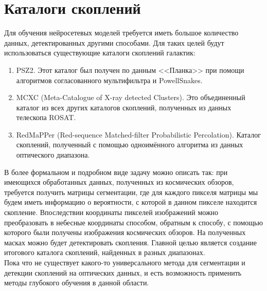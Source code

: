\section{Каталоги скоплений}
Для обучения нейросетевых моделей требуется иметь большое количество данных, детектированных другими
способами. Для таких целей будут использоваться существующие каталоги скоплений галактик:

\begin{enumerate}
	\item PSZ2. Этот каталог был получен по данным <<Планка>>  при помощи алгоритмов 
	согласованного мультифильтра и PowellSnakes.
	\item MCXC (Meta-Catalogue of X-ray detected Clusters). Это объединенный каталог из всех 
	других каталогов скоплений, полученных из данных телескопа ROSAT.
	\item RedMaPPer (Red-sequence Matched-filter Probabilistic Percolation). Каталог скоплений, 
	полученный с помощью одноимённого алгоритма из данных оптического диапазона.
\end{enumerate}


В более формальном и подробном виде задачу можно описать так: при имеющихся обработанных данных, 
полученных из космических обзоров, требуется получить матрицы сегментации, где для каждого пикселя 
матрицы мы будем иметь информацию о вероятности, с которой в данном пикселе находится скопление. 
Впоследствии координаты пикселей изображений можно преобразовать в небесные координаты способом, 
обратным к способу, с помощью которого были получены изображения космических обзоров. На полученных 
масках можно будет детектировать скопления. Главной целью является создание итогового каталога 
скоплений, найденных в разных диапазонах.\\

Пока что не существует какого-то универсального метода для сегментации и детекции скоплений 
на оптических данных, и есть возможность применить методы глубокого обучения в данной области.\\


